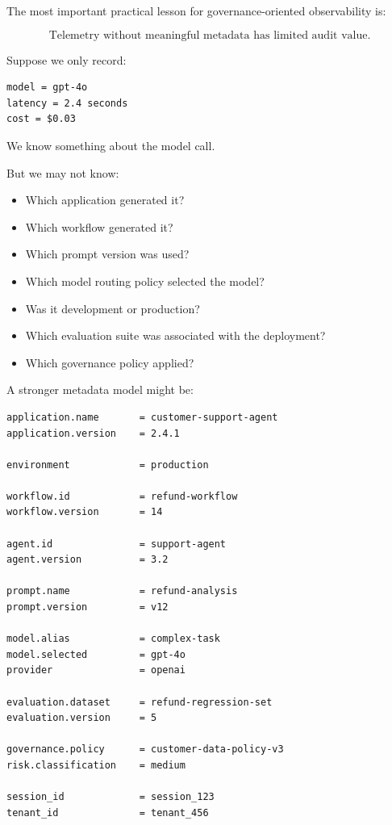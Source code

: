 \documentclass[11pt,a4paper]{article}
\begin{document}
The most important practical lesson for governance-oriented observability is:

\[
\boxed{
\text{Telemetry without meaningful metadata has limited audit value.}
}
\]

Suppose we only record:

\begin{lstlisting}
model = gpt-4o
latency = 2.4 seconds
cost = $0.03
\end{lstlisting}

We know something about the model call.

But we may not know:

\begin{itemize}
\item Which application generated it?
\item Which workflow generated it?
\item Which prompt version was used?
\item Which model routing policy selected the model?
\item Was it development or production?
\item Which evaluation suite was associated with the deployment?
\item Which governance policy applied?
\end{itemize}

A stronger metadata model might be:

\begin{lstlisting}
application.name       = customer-support-agent
application.version    = 2.4.1

environment            = production

workflow.id            = refund-workflow
workflow.version       = 14

agent.id               = support-agent
agent.version          = 3.2

prompt.name            = refund-analysis
prompt.version         = v12

model.alias            = complex-task
model.selected         = gpt-4o
provider               = openai

evaluation.dataset     = refund-regression-set
evaluation.version     = 5

governance.policy      = customer-data-policy-v3
risk.classification    = medium

session_id             = session_123
tenant_id              = tenant_456
\end{lstlisting}
\end{document}
